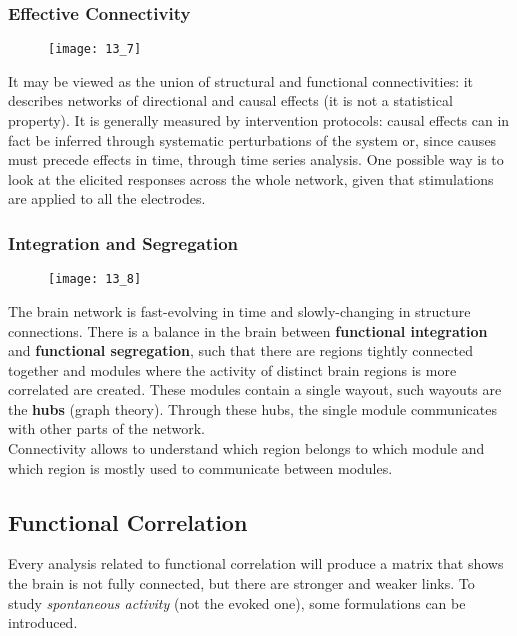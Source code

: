 \subsubsection{Effective Connectivity}
\begin{figure}[H]
    \centering
    \texttt{[image: 13\_7]}
\end{figure}
It may be viewed as the union of structural and functional connectivities: it
describes networks of directional and causal effects (it is not a statistical property).
It is generally measured by intervention protocols: causal effects can in fact be
inferred through systematic perturbations of the system or, since causes must precede
effects in time, through time series analysis. One possible way is to look at the
elicited responses across the whole network, given that stimulations are applied to
all the electrodes.
\subsubsection{Integration and Segregation}
\begin{figure}[H]
    \centering
    \texttt{[image: 13\_8]}
\end{figure}
The brain network is fast-evolving in time and slowly-changing in structure connections.
There is a balance in the brain between \textbf{functional integration} and
\textbf{functional segregation}, such that there are regions tightly connected
together and modules where the activity of distinct brain regions is more correlated
are created. These modules contain a single wayout, such wayouts are the \textbf{hubs}
(graph theory). Through these hubs, the single module communicates with other parts of
the network.\\
Connectivity allows to understand which region belongs to which module and which
region is mostly used to communicate between modules.

\subsection{Functional Correlation}
Every analysis related to functional correlation will produce a matrix that shows
the brain is not fully connected, but there are stronger and weaker links.
To study \textit{spontaneous activity} (not the evoked one), some formulations can be
introduced.
